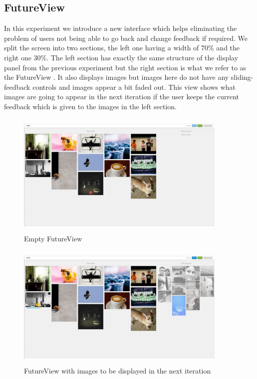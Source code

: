 \documentclass[english]{tktltiki}
\begin{document}
\subsection{FutureView}

In this experiment we introduce a new interface which helps eliminating the problem of users not being able to go back and change feedback if required. We split the screen into two sections, the left one having a width of 70\% and the right one 30\%. The left section has exactly the same structure of the display panel from the previous experiment but the right section is what we refer to as the FutureView \cite{future_view}. It also displays images but images here do not have any sliding-feedback controls and images appear a bit faded out. This view shows what images are going to appear in the next iteration if the user keeps the current feedback which is given to the images in the left section.

\begin{figure}[h!]
  \centering
    \includegraphics[width=0.90\textwidth,height=6cm]{figures/future_sample_1.jpg}
    \caption{Empty FutureView}
    \label{fut_samp_1}
\end{figure}

\begin{figure}[h!]
  \centering
    \includegraphics[width=0.90\textwidth,height=6cm]{figures/future_sample_2.jpg}
    \caption{FutureView with images to be displayed in the next iteration}
    \label{fut_samp_2}
\end{figure}
\end{document}
